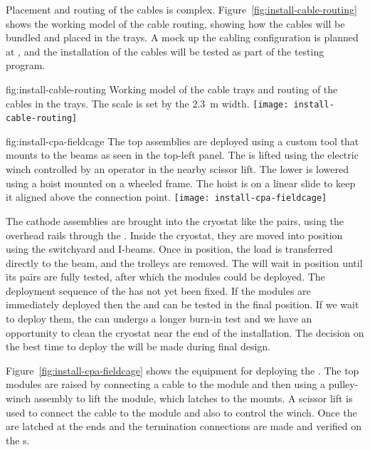 Placement and routing of the cables is complex. 
Figure~\ref{fig:install-cable-routing} shows the working \threed model of the cable routing, showing how the cables will be bundled and placed in the trays. 
A mock up the cabling configuration is planned at , and the installation of the cables will be tested as part of the  testing program.

\begin{dunefigure}{fig:install-cable-routing}
  {Working model of the cable trays and routing of the  cables in the trays. The scale is set by the \SI{2.3}{\meter}  width.}
\texttt{[image: install-cable-routing]}
\end{dunefigure}


\begin{dunefigure}{fig:install-cpa-fieldcage}
  {The top  assemblies are deployed using a custom tool that mounts to the  beams as seen in the top-left panel. The   is lifted using the electric winch controlled by an operator in the nearby scissor lift. The lower   is lowered using a hoist mounted on a wheeled frame. The hoist is on a linear slide to keep it aligned above the connection point.}
\texttt{[image: install-cpa-fieldcage]}
\end{dunefigure}

The cathode  assemblies are brought into the cryostat like the  pairs, using the overhead rails through the . 
Inside the cryostat, they are moved into position using the  switchyard and  I-beams. 
Once in position, the load is transferred directly to the  beam, and the trolleys are removed. 
The  will wait in position until its  pairs are fully tested, after which the  modules could be deployed. 
The deployment sequence of the  has not yet been fixed. 
If the  modules are immediately deployed then the  and  can be tested in the final position. 
If we wait to deploy them, the  can undergo a longer burn-in test and we have an  opportunity to clean the cryostat near the end of the installation. 
The decision on the best time to deploy the  will be made during final design.

Figure~\ref{fig:install-cpa-fieldcage} shows the equipment for deploying the . 
The top  modules are raised by connecting a cable to the module and then using a pulley-winch assembly to lift the module, which latches to the  mounts. 
A scissor lift is used to connect the cable to the module and also to control the winch. 
Once the  are latched at the  ends and the  termination connections are made and verified on the s.

